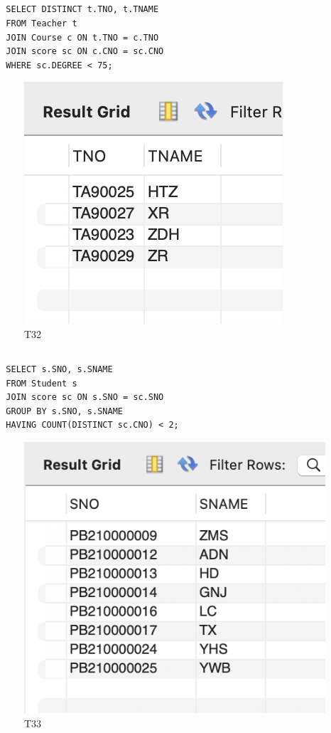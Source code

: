 \documentclass[UTF8]{ctexart}
\begin{document}
\subsection{}
\begin{lstlisting}
  SELECT DISTINCT t.TNO, t.TNAME
  FROM Teacher t
  JOIN Course c ON t.TNO = c.TNO
  JOIN score sc ON c.CNO = sc.CNO
  WHERE sc.DEGREE < 75;  
\end{lstlisting}
\begin{figure}[H]
  \centering
  \includegraphics[scale=0.7]{pics/32.png}
  \caption*{T32}
\end{figure}

\subsection{}
\begin{lstlisting}
  SELECT s.SNO, s.SNAME
  FROM Student s
  JOIN score sc ON s.SNO = sc.SNO
  GROUP BY s.SNO, s.SNAME
  HAVING COUNT(DISTINCT sc.CNO) < 2;  
\end{lstlisting}
\begin{figure}[H]
  \centering
  \includegraphics[scale=0.7]{pics/33.png}
  \caption*{T33}
\end{figure}
\end{document}
